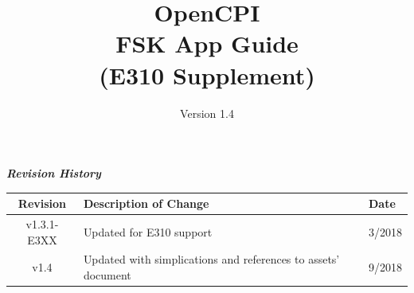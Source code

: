 \def\docTitle{OpenCPI\\ FSK App Guide\\ (E310 Supplement)}
\def\docVersion{1.4}

\date{Version \docVersion} %
\title{\docTitle}
\usepackage{graphicx}
\graphicspath{ {figures/} }
\usepackage{textcomp}


\maketitle
\newpage
	\begin{center}
	\textit{\textbf{Revision History}}
		\begin{table}[H]
		\label{table:revisions} %
			\begin{tabularx}{\textwidth}{|c|X|l|}
			\hline
			\rowcolor{blue}
			\textbf{Revision} & \textbf{Description of Change} & \textbf{Date} \\
			\hline
			v1.3.1-E3XX & Updated for E310 support & 3/2018 \\
			\hline
			v1.4 & Updated with simplications and references to assets' document & 9/2018 \\
			\hline
			\end{tabularx}
		\end{table}
	\end{center}

